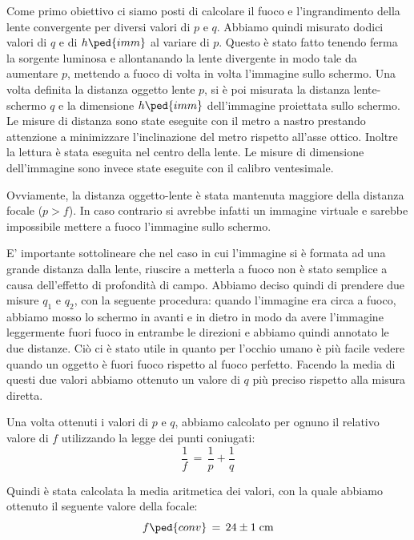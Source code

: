 Come primo obiettivo ci siamo posti di calcolare il fuoco e l'ingrandimento della lente convergente per diversi valori di $p$ e $q$. Abbiamo quindi misurato dodici valori di $q$ e di $h\ped{imm}$ al variare di $p$.
Questo è stato fatto tenendo ferma la sorgente luminosa e allontanando la lente divergente in modo tale da aumentare $p$, mettendo a fuoco di volta in volta l'immagine sullo schermo. %
Una volta definita la distanza oggetto lente $p$, si è poi misurata la distanza lente-schermo $q$ e la dimensione $h\ped{imm}$ dell'immagine proiettata sullo schermo. Le misure di distanza sono state eseguite con il metro a nastro prestando attenzione a minimizzare l'inclinazione del metro rispetto all'asse ottico. Inoltre la lettura è stata eseguita nel centro della lente. Le misure di dimensione dell'immagine sono invece state eseguite con il calibro ventesimale.

Ovviamente, la distanza oggetto-lente è stata mantenuta maggiore della distanza focale ($p > f$). In caso contrario si avrebbe infatti un immagine virtuale e sarebbe impossibile mettere a fuoco l'immagine sullo schermo.

E' importante sottolineare che nel caso in cui l'immagine si è formata ad una grande distanza dalla lente, riuscire a metterla a fuoco non è stato semplice a causa dell'effetto di profondità di campo. Abbiamo deciso quindi di prendere due misure $q_1$ e $q_2$, con la seguente procedura: quando l'immagine era circa a fuoco, abbiamo mosso lo schermo in avanti e in dietro in modo da avere l'immagine leggermente fuori fuoco in entrambe le direzioni e abbiamo quindi annotato le due distanze. Ciò ci è stato utile in quanto per l'occhio umano è più facile vedere quando un oggetto è fuori fuoco rispetto al fuoco perfetto. Facendo la media di questi due valori abbiamo ottenuto un valore di $q$ %
più preciso rispetto alla misura diretta.

Una volta ottenuti i valori  di $p$ e $q$, abbiamo calcolato per ognuno il relativo valore di $f$ utilizzando la legge dei punti coniugati:
\begin{equation}
	\frac{1}{f} \,=\, \frac{1}{p} + \frac{1}{q}
	\label{eq:coniugati}
\end{equation}

Quindi è stata calcolata la media aritmetica dei valori, con la quale abbiamo ottenuto il seguente valore della focale:
\begin{equation}
    f \ped{conv} \,=\, 24 \pm 1 \; \si{\centi\metre}
\end{equation}

